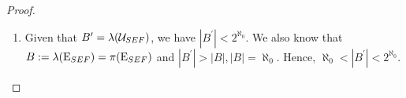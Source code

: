 \begin{proof}
\begin{enumerate}
    \item Given that $B^\prime = \lambda(\mathcal{U}_{SEF})$, we have $|B^\prime| < 2^{\aleph_0}$. We also know that $B := \lambda(\mathrm{E}_{SEF}) = \pi(\mathrm{E}_{SEF})$ and $|B^\prime| > |B|, |B| = \aleph_0$. Hence, $\aleph_0 < |B^\prime| < 2^{\aleph_0}$.
  \end{enumerate}
\end{proof}
